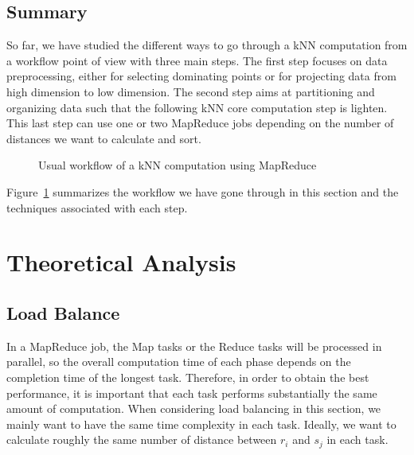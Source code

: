 \documentclass[10pt,journal,compsoc]{IEEEtran}
\begin{document}
\subsection{Summary}
So far, we have studied the different ways to go through a kNN computation from a workflow point of view with three main steps.
The first step focuses on data preprocessing, either for selecting dominating points or for projecting data from high dimension to low dimension.
The second step aims at partitioning and organizing data such that the following kNN core computation step is lighten. This last step can use one or two MapReduce jobs depending on the number of distances we want to calculate and sort.
\begin{figure}[htp]
\center
{}
\caption{Usual workflow of a kNN computation using MapReduce \label{workflow}}
\end{figure}
Figure~\ref{workflow} summarizes the 
workflow we have gone through in this section and the techniques associated with each step.

%
\section{Theoretical Analysis}\label{analysis}
\label{sec:analysis}
\subsection{Load Balance}
\label{sec:load_balance}
In a MapReduce job, the Map tasks or the Reduce tasks will be processed in parallel, so the 
overall computation time of each phase depends on the completion time of the longest task. 
Therefore, in order to obtain the best performance, it is important that each task performs 
substantially the same amount of computation.  When considering load balancing in this section, we 
mainly want to have the same time complexity in each task. Ideally, we want to calculate roughly 
the same number of distance between $r_i$ and $s_j$ in each task.
\end{document}
